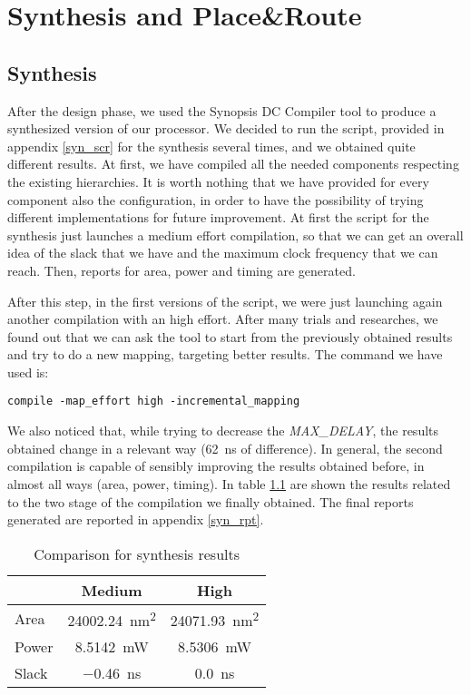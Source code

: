 \chapter{Synthesis and Place\&Route}
\label{chap_synth}

\section{Synthesis}
After the design phase, we used the Synopsis DC Compiler tool to produce a synthesized version of our \dlx processor. We decided to run the script, provided in appendix \ref{syn_scr} for the synthesis several times, and we obtained quite different results.
At first, we have compiled all the needed components respecting the existing hierarchies. It is worth nothing that we have provided for every component also the configuration, in order to have the possibility of trying different implementations for future improvement. At first the script for the synthesis just launches a medium effort compilation, so that we can get an overall idea of the slack that we have and the maximum clock frequency that we can reach. 
Then, reports for area, power and timing are generated.

After this step, in the first versions of the script, we were just launching again another compilation with an high effort. After many trials and researches, we found out that we can ask the tool to start from the previously obtained results and try to do a new mapping, targeting better results. The command we have used is:
\begin{lstlisting}[style=B]
	compile -map_effort high -incremental_mapping
\end{lstlisting}

We also noticed that, while trying to decrease the \textit{MAX\_DELAY}, the results obtained change in a relevant way (\SI{62}{\nano\second} of difference). In general, the second compilation is capable of sensibly improving the results obtained before, in almost all ways (area, power, timing). In table \ref{tab_rep} are shown the results related to the two stage of the compilation we finally obtained.
The final reports generated are reported in appendix \ref{syn_rpt}.

\begin{table}[]
	\centering
	\begin{tabular}{l|cc}
		\toprule
				& Medium  						& High  								\\
		\midrule
		Area	& \SI{24002.24}{\nano\meter^2}	&  	\SI{24071.93}{\nano\meter^2}		\\
		Power	& \SI{8.5142}{\milli\watt}		&  	\SI{8.5306}{\milli\watt}			\\
		Slack	& \SI{-0.46}{\nano\second}		&	\SI{0.0}{\nano\second}				\\ 
		\bottomrule
	\end{tabular}
\caption{Comparison for synthesis results}
\label{tab_rep}
\end{table}

